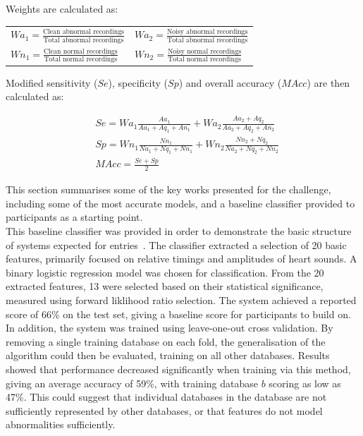 \documentclass[titlepage, 12pt]{scrartcl} \usepackage{enumitem}
\begin{document}
\doublespacing

Weights are calculated as:
\begin{table}[H]
\centering
\doublespacing
\begin{tabular}{ll}
$Wa_1 = \frac{\text{Clean abnormal recordings}}{\text{Total abnormal recordings}}$ & $Wa_2 = \frac{\text{Noisy abnormal recordings}}{\text{Total abnormal recordings}}$ \\
$Wn_1 = \frac{\text{Clean normal recordings}}{\text{Total normal recordings}}$     & $Wn_2 = \frac{\text{Noisy normal recordings}}{\text{Total normal recordings}}$
\end{tabular}
\end{table}

Modified sensitivity ($Se$), specificity ($Sp$) and overall accuracy ($MAcc$) are then calculated as:

\begin{align*}
    &Se=Wa_1\frac{Aa_1}{Aa_1+Aq_1+An_1}+Wa_2\frac{Aa_2+Aq_2}{Aa_2+Aq_2+An_2} \\
    &Sp=Wn_1\frac{Nn_1}{Na_1+Nq_1+Nn_1}+Wn_2\frac{Nn_2+Nq_2}{Na_2+Nq_2+Nn_2} \\
    &MAcc=\frac{Se+Sp}{2}
\end{align*}

This section summarises some of the key works presented for the challenge,
including some of the most accurate models, and a baseline classifier
provided to participants as a starting point.\\

This baseline classifier was provided in order to demonstrate the basic
structure of systems expected for entries~\parencite{Liu2016}. The classifier
extracted a selection of 20 basic features, primarily focused on relative
timings and amplitudes of heart sounds.  A binary logistic regression model was
chosen for classification. From the 20 extracted features, 13 were selected
based on their statistical significance, measured using forward liklihood ratio
selection. The system achieved a reported score of 66\% on the test set, giving
a baseline score for participants to build on.  In addition, the system was
trained using leave-one-out cross validation. By removing a single training
database on each fold, the generalisation of the algorithm could then be
evaluated, training on all other databases. Results showed that performance
decreased significantly when training via this method, giving an average
accuracy of 59\%, with training database $b$ scoring as low as 47\%.  This
could suggest that individual databases in the database are not sufficiently
represented by other databases, or that features do not model abnormalities
sufficiently.\\
\end{document}
